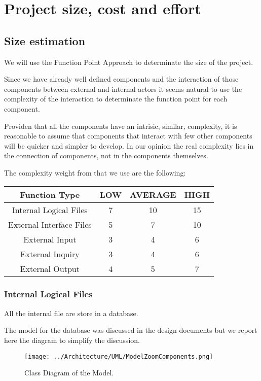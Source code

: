 \documentclass[11pt]{article} %
\begin{document}
\section{Project size, cost and effort}

\subsection{Size estimation}

We will use the Function Point Approach to determinate the size of the project.

Since we have already well defined components and the interaction of those components between external and internal actors it seems natural to use the complexity of the interaction to determinate the function point for each component.

Providen that all the components have an intrisic, similar, complexity, it is reasonable to assume that components that interact with few other components will be quicker and simpler to develop. In our opinion the real complexity lies in the connection of components, not in the components themselves.

The complexity weight from that we use are the following:

\begin{tabular}{| c | c | c | c |}
\hline
Function Type & LOW & AVERAGE & HIGH \\
\hline
Internal Logical Files & 7 & 10 & 15 \\
External Interface Files & 5 & 7 & 10 \\
External Input & 3 & 4 & 6 \\
External Inquiry & 3 & 4 & 6 \\
External Output & 4 & 5 & 7 \\
\hline
\end{tabular}



\subsubsection{Internal Logical Files}

All the internal file are store in a database.

The model for the database was discussed in the design documents but we report here the diagram to simplify the discussion.

\begin{figure}[H]
	\centering
	\texttt{[image: ../Architecture/UML/ModelZoomComponents.png]}
	\caption{Class Diagram of the Model.}
\end{figure}	
\end{document}
